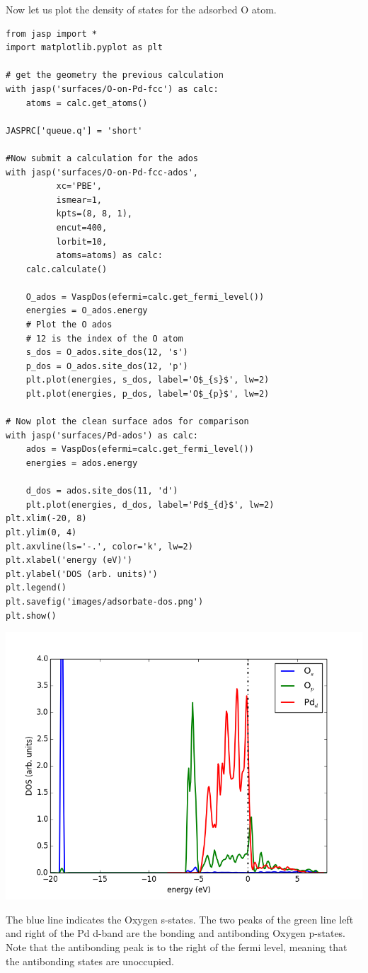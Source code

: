 \documentclass[11pt]{article}
\begin{document}
Now let us plot the density of states for the adsorbed O atom.

\begin{verbatim}
from jasp import *
import matplotlib.pyplot as plt

# get the geometry the previous calculation
with jasp('surfaces/O-on-Pd-fcc') as calc:
    atoms = calc.get_atoms()

JASPRC['queue.q'] = 'short'

#Now submit a calculation for the ados
with jasp('surfaces/O-on-Pd-fcc-ados',
          xc='PBE',
          ismear=1,
          kpts=(8, 8, 1),
          encut=400,
          lorbit=10,
          atoms=atoms) as calc:
    calc.calculate()

    O_ados = VaspDos(efermi=calc.get_fermi_level())
    energies = O_ados.energy
    # Plot the O ados
    # 12 is the index of the O atom
    s_dos = O_ados.site_dos(12, 's') 
    p_dos = O_ados.site_dos(12, 'p')
    plt.plot(energies, s_dos, label='O$_{s}$', lw=2)
    plt.plot(energies, p_dos, label='O$_{p}$', lw=2)    

# Now plot the clean surface ados for comparison
with jasp('surfaces/Pd-ados') as calc:
    ados = VaspDos(efermi=calc.get_fermi_level())
    energies = ados.energy
    
    d_dos = ados.site_dos(11, 'd')
    plt.plot(energies, d_dos, label='Pd$_{d}$', lw=2)
plt.xlim(-20, 8)
plt.ylim(0, 4)
plt.axvline(ls='-.', color='k', lw=2)
plt.xlabel('energy (eV)')
plt.ylabel('DOS (arb. units)')
plt.legend()
plt.savefig('images/adsorbate-dos.png')
plt.show()
\end{verbatim}

\includegraphics[width=.9\linewidth]{./images/adsorbate-dos.png}

The blue line indicates the Oxygen s-states. The two peaks of the green line left and right of the Pd d-band are the bonding and antibonding Oxygen p-states. Note that the antibonding peak is to the right of the fermi level, meaning that the antibonding states are unoccupied.
\end{document}
